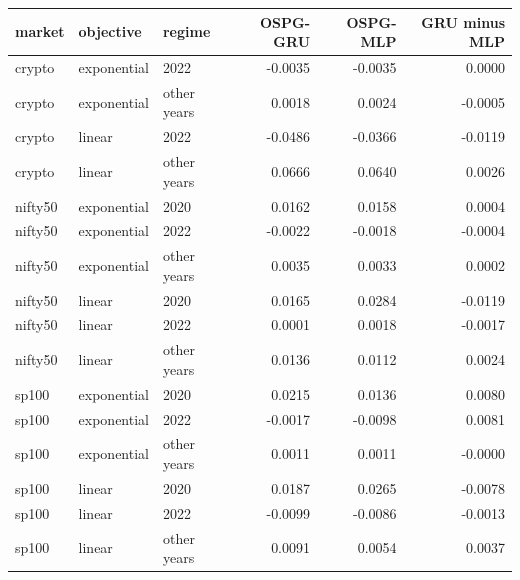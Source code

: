 \begin{tabular}{lllrrr}
\toprule
market & objective & regime & OSPG-GRU & OSPG-MLP & GRU minus MLP \\
\midrule
crypto & exponential & 2022 & -0.0035 & -0.0035 & 0.0000 \\
crypto & exponential & other years & 0.0018 & 0.0024 & -0.0005 \\
crypto & linear & 2022 & -0.0486 & -0.0366 & -0.0119 \\
crypto & linear & other years & 0.0666 & 0.0640 & 0.0026 \\
nifty50 & exponential & 2020 & 0.0162 & 0.0158 & 0.0004 \\
nifty50 & exponential & 2022 & -0.0022 & -0.0018 & -0.0004 \\
nifty50 & exponential & other years & 0.0035 & 0.0033 & 0.0002 \\
nifty50 & linear & 2020 & 0.0165 & 0.0284 & -0.0119 \\
nifty50 & linear & 2022 & 0.0001 & 0.0018 & -0.0017 \\
nifty50 & linear & other years & 0.0136 & 0.0112 & 0.0024 \\
sp100 & exponential & 2020 & 0.0215 & 0.0136 & 0.0080 \\
sp100 & exponential & 2022 & -0.0017 & -0.0098 & 0.0081 \\
sp100 & exponential & other years & 0.0011 & 0.0011 & -0.0000 \\
sp100 & linear & 2020 & 0.0187 & 0.0265 & -0.0078 \\
sp100 & linear & 2022 & -0.0099 & -0.0086 & -0.0013 \\
sp100 & linear & other years & 0.0091 & 0.0054 & 0.0037 \\
\bottomrule
\end{tabular}
